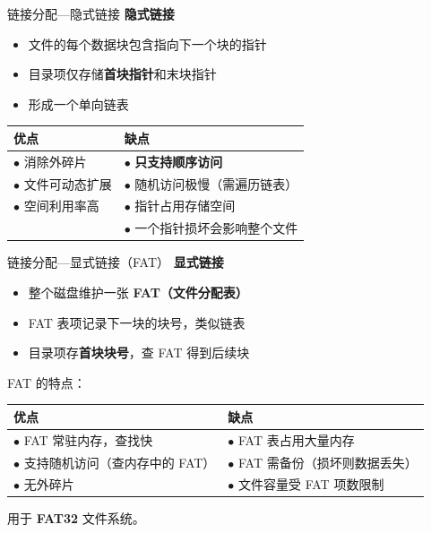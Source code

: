 \documentclass[10pt, aspectratio=169]{beamer}
\begin{document}
\begin{frame}{链接分配---隐式链接}
    \textbf{隐式链接}
    \begin{itemize}
        \item 文件的每个数据块包含指向下一个块的指针
        \item 目录项仅存储\textbf{首块指针}和末块指针
        \item 形成一个单向链表
    \end{itemize}
    \vspace{0.5em}
    \begin{center}
        \begin{tabular}{|l|l|}
            \hline
            \textbf{优点} & \textbf{缺点} \\
            \hline
            $\bullet$ 消除外碎片 & $\bullet$ \textbf{只支持顺序访问} \\
            $\bullet$ 文件可动态扩展 & $\bullet$ 随机访问极慢（需遍历链表） \\
            $\bullet$ 空间利用率高 & $\bullet$ 指针占用存储空间 \\
            & $\bullet$ 一个指针损坏会影响整个文件 \\
            \hline
        \end{tabular}
    \end{center}
\end{frame}

\begin{frame}{链接分配---显式链接（FAT）}
    \textbf{显式链接}
    \begin{itemize}
        \item 整个磁盘维护一张 \textbf{FAT（文件分配表）}
        \item FAT 表项记录下一块的块号，类似链表
        \item 目录项存\textbf{首块块号}，查 FAT 得到后续块
    \end{itemize}
    \vspace{0.5em}
    FAT 的特点：
    \begin{center}
        \begin{tabular}{|l|l|}
            \hline
            \textbf{优点} & \textbf{缺点} \\
            \hline
            $\bullet$ FAT 常驻内存，查找快 & $\bullet$ FAT 表占用大量内存 \\
            $\bullet$ 支持随机访问（查内存中的 FAT） & $\bullet$ FAT 需备份（损坏则数据丢失） \\
            $\bullet$ 无外碎片 & $\bullet$ 文件容量受 FAT 项数限制 \\
            \hline
        \end{tabular}
    \end{center}
    用于 \textbf{FAT32} 文件系统。
\end{frame}
\end{document}
